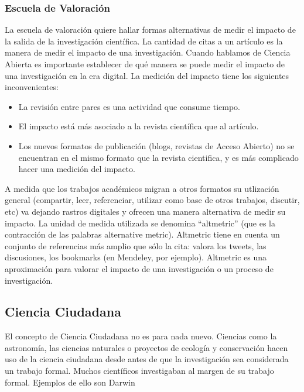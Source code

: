 \subsubsection{Escuela de Valoración} 	
	
	La escuela de valoración quiere hallar formas alternativas de medir el impacto de la salida de la investigación científica. La cantidad de citas a un artículo es la manera de medir el impacto de una investigación. Cuando hablamos de Ciencia Abierta es importante establecer de qué manera se puede medir el impacto de una investigación en la era digital. La medición del impacto tiene los siguientes inconvenientes:
	\begin{itemize}
	\item La revisión entre pares es una actividad que consume tiempo.
	\item El impacto está más asociado a la revista científica que al artículo.
	\item Los nuevos formatos de publicación (blogs, revistas de Acceso Abierto) no se encuentran en el mismo formato que la revista cientifica, y es más complicado hacer una medición del impacto.
	\end{itemize}
	A medida que los trabajos académicos migran a otros formatos su utlización general (compartir, leer, referenciar, utilizar como base de otros trabajos, discutir, etc) va dejando rastros digitales y ofrecen una manera alternativa de medir su impacto. La unidad de medida utilizada se denomina ``altmetric'' (que es la contracción de las palabras alternative metric). Altmetric tiene en cuenta un conjunto de referencias más amplio que sólo la cita: valora los tweets, las discusiones, los bookmarks (en Mendeley, por ejemplo). Altmetric es una aproximación para valorar el impacto de una investigación o un proceso de investigación. 	
	
	
\subsection{Ciencia Ciudadana}
	
	El concepto de Ciencia Ciudadana no es para nada nuevo. Ciencias como la astronomía, las ciencias naturales o proyectos de ecología y conservación hacen uso de la ciencia ciudadana desde antes de que la investigación sea considerada un trabajo formal. Muchos científicos investigaban al margen de su trabajo formal. Ejemplos de ello son Darwin 


